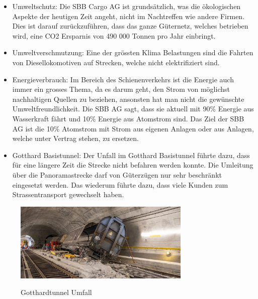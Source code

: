\documentclass{article}
\begin{document}
\begin{itemize}
\item Umweltschutz:
Die SBB Cargo AG ist grundsätzlich, was die ökologischen Aspekte der heutigen Zeit angeht, nicht im Nachtreffen wie andere Firmen.
Dies ist darauf zurückzuführen, dass das ganze Güternetz, welches betrieben wird, eine CO2 Ersparnis von 490 000 Tonnen pro Jahr einbringt.

\item Umweltverschmutzung:
Eine der grössten Klima Belastungen sind die Fahrten von Diesellokomotiven auf Strecken, welche nicht elektrifiziert sind.   

\item Energieverbrauch: Im Bereich des Schienenverkehrs ist die Energie auch immer ein grosses Thema, da es darum geht, den Strom von möglichst nachhaltigen Quellen zu beziehen, ansonsten hat man nicht die gewünschte Umweltfreundlichkeit. 
Die SBB AG sagt, dass sie aktuell mit 90\% Energie aus Wasserkraft fährt und 10\% Energie aus Atomstrom sind. Das Ziel der SBB AG ist die 10\% Atomstrom mit Strom aus eigenen Anlagen oder aus Anlagen, welche unter Vertrag stehen, zu ersetzen.
\item Gotthard Basistunnel:
Der Unfall im Gotthard Basistunnel führte dazu, dass für eine längere Zeit die Strecke nicht befahren werden konnte.
Die Umleitung über die Panoramastrecke darf von Güterzügen nur sehr beschränkt eingesetzt werden.
Das wiederum führte dazu, dass viele Kunden zum Strassentransport gewechselt haben.
\end{itemize}

\begin{figure}[htbp] %
    \centering
    \includegraphics[width=0.75\textwidth]{umfallGotthard} %
    \caption{Gotthardtunnel Umfall}\parencite[o. S.]{gotthardtunnelBild}
    \label{fig:bildlabel}
\end{figure}
\end{document}
